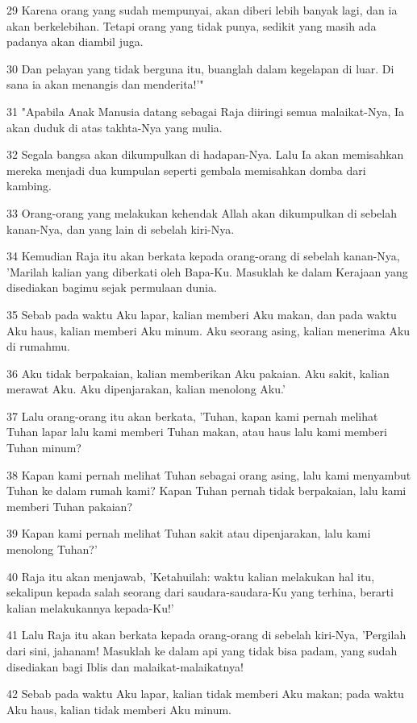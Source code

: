 \par 29 Karena orang yang sudah mempunyai, akan diberi lebih banyak lagi, dan ia akan berkelebihan. Tetapi orang yang tidak punya, sedikit yang masih ada padanya akan diambil juga.
\par 30 Dan pelayan yang tidak berguna itu, buanglah dalam kegelapan di luar. Di sana ia akan menangis dan menderita!'"
\par 31 "Apabila Anak Manusia datang sebagai Raja diiringi semua malaikat-Nya, Ia akan duduk di atas takhta-Nya yang mulia.
\par 32 Segala bangsa akan dikumpulkan di hadapan-Nya. Lalu Ia akan memisahkan mereka menjadi dua kumpulan seperti gembala memisahkan domba dari kambing.
\par 33 Orang-orang yang melakukan kehendak Allah akan dikumpulkan di sebelah kanan-Nya, dan yang lain di sebelah kiri-Nya.
\par 34 Kemudian Raja itu akan berkata kepada orang-orang di sebelah kanan-Nya, 'Marilah kalian yang diberkati oleh Bapa-Ku. Masuklah ke dalam Kerajaan yang disediakan bagimu sejak permulaan dunia.
\par 35 Sebab pada waktu Aku lapar, kalian memberi Aku makan, dan pada waktu Aku haus, kalian memberi Aku minum. Aku seorang asing, kalian menerima Aku di rumahmu.
\par 36 Aku tidak berpakaian, kalian memberikan Aku pakaian. Aku sakit, kalian merawat Aku. Aku dipenjarakan, kalian menolong Aku.'
\par 37 Lalu orang-orang itu akan berkata, 'Tuhan, kapan kami pernah melihat Tuhan lapar lalu kami memberi Tuhan makan, atau haus lalu kami memberi Tuhan minum?
\par 38 Kapan kami pernah melihat Tuhan sebagai orang asing, lalu kami menyambut Tuhan ke dalam rumah kami? Kapan Tuhan pernah tidak berpakaian, lalu kami memberi Tuhan pakaian?
\par 39 Kapan kami pernah melihat Tuhan sakit atau dipenjarakan, lalu kami menolong Tuhan?'
\par 40 Raja itu akan menjawab, 'Ketahuilah: waktu kalian melakukan hal itu, sekalipun kepada salah seorang dari saudara-saudara-Ku yang terhina, berarti kalian melakukannya kepada-Ku!'
\par 41 Lalu Raja itu akan berkata kepada orang-orang di sebelah kiri-Nya, 'Pergilah dari sini, jahanam! Masuklah ke dalam api yang tidak bisa padam, yang sudah disediakan bagi Iblis dan malaikat-malaikatnya!
\par 42 Sebab pada waktu Aku lapar, kalian tidak memberi Aku makan; pada waktu Aku haus, kalian tidak memberi Aku minum.
